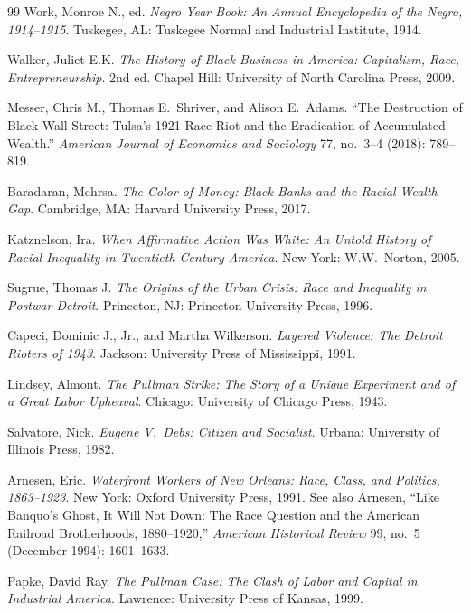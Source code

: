 \documentclass[12pt,openany]{book}
\begin{document}
\begin{thebibliography}{99}
Work, Monroe N., ed. \textit{Negro Year Book: An Annual Encyclopedia of the Negro, 1914--1915}. Tuskegee, AL: Tuskegee Normal and Industrial Institute, 1914.

Walker, Juliet E.K. \textit{The History of Black Business in America: Capitalism, Race, Entrepreneurship}. 2nd ed. Chapel Hill: University of North Carolina Press, 2009.

Messer, Chris M., Thomas E.\ Shriver, and Alison E.\ Adams. ``The Destruction of Black Wall Street: Tulsa's 1921 Race Riot and the Eradication of Accumulated Wealth.'' \textit{American Journal of Economics and Sociology} 77, no.~3--4 (2018): 789--819.

Baradaran, Mehrsa. \textit{The Color of Money: Black Banks and the Racial Wealth Gap}. Cambridge, MA: Harvard University Press, 2017.

Katznelson, Ira. \textit{When Affirmative Action Was White: An Untold History of Racial Inequality in Twentieth-Century America}. New York: W.W.\ Norton, 2005.


Sugrue, Thomas J. \textit{The Origins of the Urban Crisis: Race and Inequality in Postwar Detroit}. Princeton, NJ: Princeton University Press, 1996.

Capeci, Dominic J., Jr., and Martha Wilkerson. \textit{Layered Violence: The Detroit Rioters of 1943}. Jackson: University Press of Mississippi, 1991.


Lindsey, Almont. \textit{The Pullman Strike: The Story of a Unique Experiment and of a Great Labor Upheaval}. Chicago: University of Chicago Press, 1943.

Salvatore, Nick. \textit{Eugene V.\ Debs: Citizen and Socialist}. Urbana: University of Illinois Press, 1982.

Arnesen, Eric. \textit{Waterfront Workers of New Orleans: Race, Class, and Politics, 1863--1923}. New York: Oxford University Press, 1991. See also Arnesen, ``Like Banquo's Ghost, It Will Not Down: The Race Question and the American Railroad Brotherhoods, 1880--1920,'' \textit{American Historical Review} 99, no.~5 (December 1994): 1601--1633.

Papke, David Ray. \textit{The Pullman Case: The Clash of Labor and Capital in Industrial America}. Lawrence: University Press of Kansas, 1999.


\end{thebibliography}
\end{document}
